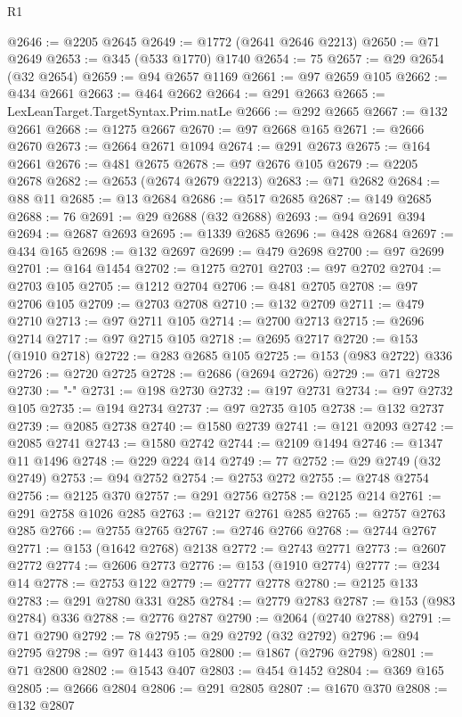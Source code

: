 \begin{lexlean}{R1}
\begin{coremodule}
{{{{{{{{{{{{{{{{{{{{{{{{{{{{{{{{{{{{{{{{{{{{{{{{{{{{{{{{{{{{{{{{{{{{{{{{{{{{{{{{{{{{{{{{{{{{{{{{{{{{{{{{{{{{{{{{{{{{{{{{{{{{{{{{{{{{{{{{{{{{{{{{{{{{{{{{{{{{{{{{{{{{{{{{{{{{{{{{{{{{{{{{{{@2646 := @2205 @2645
@2649 := @1772 (@2641 @2646 @2213)
@2650 := @71 @2649
@2653 := @345 (@533 @1770) @1740
@2654 := 75
@2657 := @29 @2654 (@32 @2654)
@2659 := @94 @2657 @1169
@2661 := @97 @2659 @105
@2662 := @434 @2661
@2663 := @464 @2662
@2664 := @291 @2663
@2665 := LexLeanTarget.TargetSyntax.Prim.natLe
@2666 := @292 @2665
@2667 := @132 @2661
@2668 := @1275 @2667
@2670 := @97 @2668 @165
@2671 := @2666 @2670
@2673 := @2664 @2671 @1094
@2674 := @291 @2673
@2675 := @164 @2661
@2676 := @481 @2675
@2678 := @97 @2676 @105
@2679 := @2205 @2678
@2682 := @2653 (@2674 @2679 @2213)
@2683 := @71 @2682
@2684 := @88 @11
@2685 := @13 @2684
@2686 := @517 @2685
@2687 := @149 @2685
@2688 := 76
@2691 := @29 @2688 (@32 @2688)
@2693 := @94 @2691 @394
@2694 := @2687 @2693
@2695 := @1339 @2685
@2696 := @428 @2684
@2697 := @434 @165
@2698 := @132 @2697
@2699 := @479 @2698
@2700 := @97 @2699
@2701 := @164 @1454
@2702 := @1275 @2701
@2703 := @97 @2702
@2704 := @2703 @105
@2705 := @1212 @2704
@2706 := @481 @2705
@2708 := @97 @2706 @105
@2709 := @2703 @2708
@2710 := @132 @2709
@2711 := @479 @2710
@2713 := @97 @2711 @105
@2714 := @2700 @2713
@2715 := @2696 @2714
@2717 := @97 @2715 @105
@2718 := @2695 @2717
@2720 := @153 (@1910 @2718)
@2722 := @283 @2685 @105
@2725 := @153 (@983 @2722) @336
@2726 := @2720 @2725
@2728 := @2686 (@2694 @2726)
@2729 := @71 @2728
@2730 := "-"
@2731 := @198 @2730
@2732 := @197 @2731
@2734 := @97 @2732 @105
@2735 := @194 @2734
@2737 := @97 @2735 @105
@2738 := @132 @2737
@2739 := @2085 @2738
@2740 := @1580 @2739
@2741 := @121 @2093
@2742 := @2085 @2741
@2743 := @1580 @2742
@2744 := @2109 @1494
@2746 := @1347 @11 @1496
@2748 := @229 @224 @14
@2749 := 77
@2752 := @29 @2749 (@32 @2749)
@2753 := @94 @2752
@2754 := @2753 @272
@2755 := @2748 @2754
@2756 := @2125 @370
@2757 := @291 @2756
@2758 := @2125 @214
@2761 := @291 @2758 @1026 @285
@2763 := @2127 @2761 @285
@2765 := @2757 @2763 @285
@2766 := @2755 @2765
@2767 := @2746 @2766
@2768 := @2744 @2767
@2771 := @153 (@1642 @2768) @2138
@2772 := @2743 @2771
@2773 := @2607 @2772
@2774 := @2606 @2773
@2776 := @153 (@1910 @2774)
@2777 := @234 @14
@2778 := @2753 @122
@2779 := @2777 @2778
@2780 := @2125 @133
@2783 := @291 @2780 @331 @285
@2784 := @2779 @2783
@2787 := @153 (@983 @2784) @336
@2788 := @2776 @2787
@2790 := @2064 (@2740 @2788)
@2791 := @71 @2790
@2792 := 78
@2795 := @29 @2792 (@32 @2792)
@2796 := @94 @2795
@2798 := @97 @1443 @105
@2800 := @1867 (@2796 @2798)
@2801 := @71 @2800
@2802 := @1543 @407
@2803 := @454 @1452
@2804 := @369 @165
@2805 := @2666 @2804
@2806 := @291 @2805
@2807 := @1670 @370
@2808 := @132 @2807
}}}}}}}}}}}}}}}}}}}}}}}}}}}}}}}}}}}}}}}}}}}}}}}}}}}}}}}}}}}}}}}}}}}}}}}}}}}}}}}}}}}}}}}}}}}}}}}}}}}}}}}}}}}}}}}}}}}}}}}}}}}}}}}}}}}}}}}}}}}}}}}}}}}}}}}}}}}}}}}}}}}}}}}}}}}}}}}}}}}}}}}}}}
\end{coremodule}
\end{lexlean}
